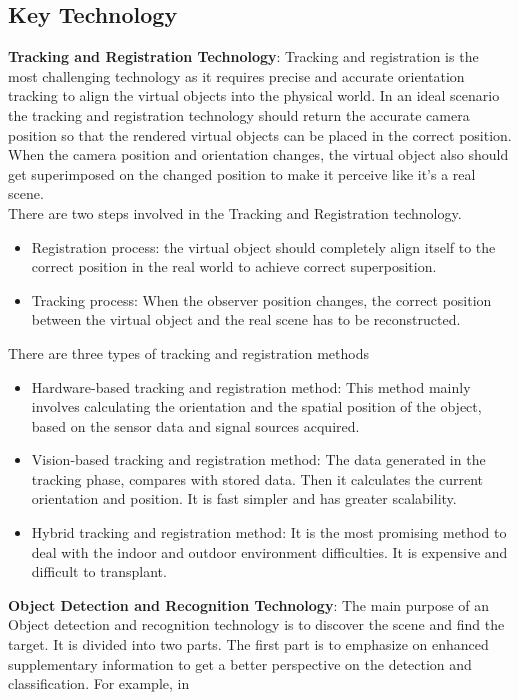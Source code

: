 \subsection{Key Technology}
\textbf{Tracking and Registration Technology}: Tracking and registration is the most 
challenging technology as it requires precise and accurate orientation tracking to align the 
virtual objects into the physical world. In an ideal scenario the tracking and registration 
technology should return the accurate camera position so that the rendered virtual objects 
can be placed in the correct position. When the camera position and orientation changes, 
the virtual object also should get superimposed on the changed position to make it 
perceive like it’s a real scene.
\\ There are two steps involved in the Tracking and Registration technology.
\begin{itemize}


\item Registration process: the virtual object should completely align itself to the 
correct position in the real world to achieve correct superposition.
\item Tracking process: When the observer position changes, the correct position 
between the virtual object and the real scene has to be reconstructed.  
\end{itemize}
 There are three types of tracking and registration methods 
 \begin{itemize}
 \item  Hardware-based tracking and registration method: This method mainly involves 
calculating the orientation and the spatial position of the object, based on the 
sensor data and signal sources acquired. 
\item Vision-based tracking and registration method: The data generated in the tracking 
phase, compares with stored data. Then it calculates the current orientation and 
position. It is fast simpler and has greater scalability. 
\item Hybrid tracking and registration method: It is the most promising method to deal 
with the indoor and outdoor environment difficulties. It is expensive and 
difficult to transplant.
\end{itemize}   
\textbf{Object Detection and Recognition Technology}: The main purpose of an Object 
detection and recognition technology is to discover the scene and find the target. It is 
divided into two parts. The first part is to emphasize on enhanced supplementary 
information to get a better perspective on the detection and classification. For example, in 
